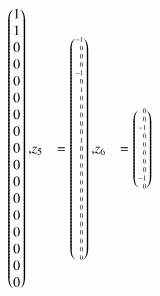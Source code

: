 \begin{beispiel}
{\begin{align*}
\begin{pmatrix*}[r]
 1\\
 1\\
 0\\
 0\\
 0\\
 0\\
 0\\
 0\\
 0\\
 0\\
 0\\
 0\\
 0\\
 0\\
 0\\
 0\\
 0
\end{pmatrix*},
&z_5 %
&=
\tiny
\begin{pmatrix*}[r]
-1\\
 0\\
 0\\
 0\\
-1\\
 0\\
 1\\
 0\\
 0\\
 0\\
 0\\
 0\\
 1\\
 0\\
 0\\
 0\\
 0\\
 0\\
 0\\
 0\\
 0\\
 0\\
 0\\
 0\\
 0\\
 0\\
 0
\end{pmatrix*},
&z_6 %
&=
\tiny
\begin{pmatrix*}[r]
 0\\
 0\\
-1\\
 0\\
 0\\
 0\\
 0\\
 0\\
-1\\
 0\\

\end{pmatrix*}
\end{align*}}
\end{beispiel}
